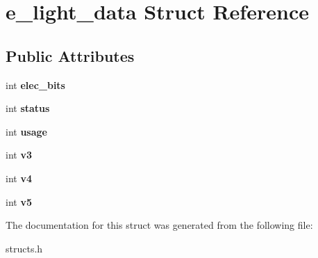 \hypertarget{structe__light__data}{\section{e\-\_\-light\-\_\-data Struct Reference}
\label{structe__light__data}
}
\subsection*{Public Attributes}
\begin{DoxyCompactItemize}
\item 
\hypertarget{structe__light__data_a4a2f59f9d1fd02fdc1a5b1bcfd15935c}{int {\bfseries elec\-\_\-bits}}\label{structe__light__data_a4a2f59f9d1fd02fdc1a5b1bcfd15935c}

\item 
\hypertarget{structe__light__data_ab853ee68a144f323a30746d3c6390355}{int {\bfseries status}}\label{structe__light__data_ab853ee68a144f323a30746d3c6390355}

\item 
\hypertarget{structe__light__data_a1f4fbe78d6dfe140d0c0cad87c426583}{int {\bfseries usage}}\label{structe__light__data_a1f4fbe78d6dfe140d0c0cad87c426583}

\item 
\hypertarget{structe__light__data_aa9fbb5ee228b191ebf6a53a7aab5dc70}{int {\bfseries v3}}\label{structe__light__data_aa9fbb5ee228b191ebf6a53a7aab5dc70}

\item 
\hypertarget{structe__light__data_a51054be16dbcafab9ff59294c1feeb4b}{int {\bfseries v4}}\label{structe__light__data_a51054be16dbcafab9ff59294c1feeb4b}

\item 
\hypertarget{structe__light__data_adadbf877a642b5a33fbcfe764043cfc5}{int {\bfseries v5}}\label{structe__light__data_adadbf877a642b5a33fbcfe764043cfc5}

\end{DoxyCompactItemize}


The documentation for this struct was generated from the following file\-:\begin{DoxyCompactItemize}
\item 
structs.\-h\end{DoxyCompactItemize}
